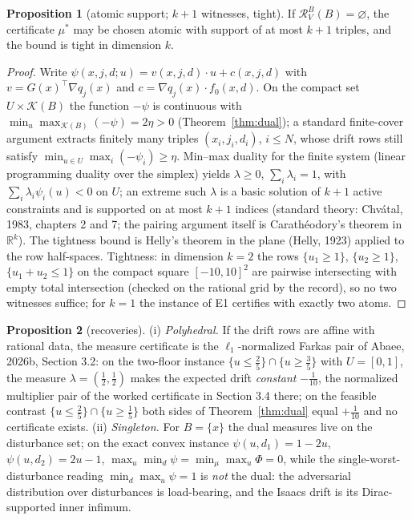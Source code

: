 \documentclass[10pt,twocolumn]{article}
\theoremstyle{definition}
\newtheorem{proposition}{Proposition}
\begin{document}
\begin{proposition}[atomic support; $k+1$ witnesses, tight]
\label{prop:sparse}
If $\mathcal{R}^{B}_{V}(B) = \varnothing$, the certificate $\mu^{*}$ may
be chosen atomic with support of at most $k+1$ triples, and the bound is
tight in dimension $k$.
\end{proposition}
\begin{proof}
Write $\psi(x,j,d;u) = v(x,j,d)\cdot u + c(x,j,d)$ with
$v = G(x)^{\top}\nabla q_{j}(x)$ and $c = \nabla q_{j}(x)\cdot f_{0}(x,d)$.
On the compact set $U \times \mathcal{K}(B)$ the function $-\psi$ is
continuous with
$\min_{u}\max_{\mathcal{K}(B)}(-\psi) = 2\eta > 0$ (Theorem~\ref{thm:dual});
a standard finite-cover argument extracts finitely many triples
$(x_{i},j_{i},d_{i})$, $i \le N$, whose drift rows still satisfy
$\min_{u \in U}\max_{i}(-\psi_{i}) \ge \eta$. Min--max duality for the
finite system (linear programming duality over the simplex) yields
$\lambda \ge 0$, $\sum_{i}\lambda_{i} = 1$, with
$\sum_{i}\lambda_{i}\psi_{i}(u) < 0$ on $U$; an extreme such
$\lambda$ is a basic solution of $k+1$ active constraints and is supported
on at most $k+1$ indices (standard theory: Chv\'{a}tal, 1983, chapters 2
and 7; the pairing argument itself is Carath\'eodory's theorem in
$\mathbb{R}^{k}$). The tightness bound is Helly's theorem in the plane
(Helly, 1923) applied to the row half-spaces. Tightness: in dimension $k = 2$ the rows
$\{u_{1} \ge 1\}$, $\{u_{2} \ge 1\}$, $\{u_{1}+u_{2} \le 1\}$ on the
compact square $[-10,10]^{2}$ are pairwise intersecting with empty total
intersection (checked on the rational grid by the record), so no two
witnesses suffice; for $k = 1$ the instance of E1 certifies with exactly
two atoms.
\end{proof}

\begin{proposition}[recoveries]\label{prop:recover}
(i) \emph{Polyhedral.} If the drift rows are affine with rational data,
the measure certificate is the $\ell_{1}$-normalized Farkas pair of
Abaee, 2026b, Section 3.2: on the two-floor instance
$\{u \le \tfrac25\} \cap \{u \ge \tfrac35\}$ with $U = [0,1]$, the
measure $\lambda = (\tfrac12,\tfrac12)$ makes the expected drift
\emph{constant} $-\tfrac1{10}$, the normalized multiplier pair of the
worked certificate in Section 3.4 there; on the feasible contrast
$\{u \le \tfrac25\} \cap \{u \ge \tfrac15\}$ both sides of
Theorem~\ref{thm:dual} equal $+\tfrac1{10}$ and no certificate exists.
(ii) \emph{Singleton.} For $B = \{x\}$ the dual measures live on the
disturbance set; on the exact convex instance
$\psi(u,d_{1}) = 1-2u$, $\psi(u,d_{2}) = 2u-1$,
$\max_{u}\min_{d}\psi = \min_{\mu}\max_{u}\Phi = 0$, while the
single-worst-disturbance reading $\min_{d}\max_{u}\psi = 1$ is
\emph{not} the dual: the adversarial distribution over disturbances is
load-bearing, and the Isaacs drift is its Dirac-supported inner
infimum.
\end{proposition}
\end{document}

